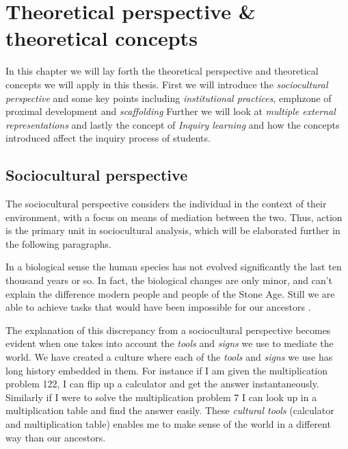 \chapter{Theoretical perspective \& theoretical concepts}

In this chapter we will lay forth the theoretical perspective and theoretical concepts we will apply in this thesis. First we will introduce the \emph{sociocultural perspective} and some key points including \emph{institutional practices}, emph{zone of proximal development} and \emph{scaffolding} Further we will look at \emph{multiple external representations} and lastly the concept of \emph{Inquiry learning} and how the concepts introduced affect the inquiry process of students.

\section{Sociocultural perspective}


The sociocultural perspective considers the individual in the context of their environment, with a focus on means of mediation between the two. Thus, action is the primary unit in sociocultural analysis, which will be elaborated further in the following paragraphs. 


In a biological sense the human species has not evolved significantly the last ten thousand years or so. In fact, the biological changes are only minor, and can’t explain the difference modern people and people of the Stone Age. Still we are able to achieve tasks that would have been impossible for our ancestors \citep{saljo2001laering}.

The explanation of this discrepancy from a sociocultural perspective becomes evident when one takes into account the \emph{tools} and \emph{signs} we use to mediate the world. We have created a culture where each of the \emph{tools} and \emph{signs} we use has long history embedded in them. For instance if I am given the multiplication problem 122, I can flip up a calculator and get the answer instantaneously. Similarly if I were to solve the multiplication problem 7 I can look up in a multiplication table and find the answer easily. These \emph{cultural tools} (calculator and multiplication table) enables me to make sense of the world in a different way than our ancestors. 

